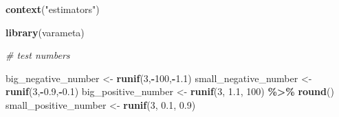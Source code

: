 \documentclass[
]{article}
\newenvironment{Shaded}{\begin{snugshade}}{\end{snugshade}}
\newcommand{\CommentTok}[1]{\textcolor[rgb]{0.56,0.35,0.01}{\textit{#1}}}
\newcommand{\DecValTok}[1]{\textcolor[rgb]{0.00,0.00,0.81}{#1}}
\newcommand{\FloatTok}[1]{\textcolor[rgb]{0.00,0.00,0.81}{#1}}
\newcommand{\KeywordTok}[1]{\textcolor[rgb]{0.13,0.29,0.53}{\textbf{#1}}}
\newcommand{\NormalTok}[1]{#1}
\newcommand{\OperatorTok}[1]{\textcolor[rgb]{0.81,0.36,0.00}{\textbf{#1}}}
\newcommand{\StringTok}[1]{\textcolor[rgb]{0.31,0.60,0.02}{#1}}
\begin{document}
\begin{Shaded}
\begin{Highlighting}[]
\KeywordTok{context}\NormalTok{(}\StringTok{"estimators"}\NormalTok{)}

\KeywordTok{library}\NormalTok{(varameta)}

\CommentTok{\# test numbers}

\NormalTok{big\_negative\_number <{-}}\StringTok{ }\KeywordTok{runif}\NormalTok{(}\DecValTok{3}\NormalTok{,}\OperatorTok{{-}}\DecValTok{100}\NormalTok{,}\OperatorTok{{-}}\FloatTok{1.1}\NormalTok{)}
\NormalTok{small\_negative\_number <{-}}\StringTok{ }\KeywordTok{runif}\NormalTok{(}\DecValTok{3}\NormalTok{,}\OperatorTok{{-}}\FloatTok{0.9}\NormalTok{,}\OperatorTok{{-}}\FloatTok{0.1}\NormalTok{)}
\NormalTok{big\_positive\_number <{-}}\StringTok{ }\KeywordTok{runif}\NormalTok{(}\DecValTok{3}\NormalTok{, }\FloatTok{1.1}\NormalTok{, }\DecValTok{100}\NormalTok{) }\OperatorTok{\%>\%}\StringTok{ }\KeywordTok{round}\NormalTok{()}
\NormalTok{small\_positive\_number <{-}}\StringTok{ }\KeywordTok{runif}\NormalTok{(}\DecValTok{3}\NormalTok{, }\FloatTok{0.1}\NormalTok{, }\FloatTok{0.9}\NormalTok{)}


\end{Highlighting}
\end{Shaded}
\end{document}
